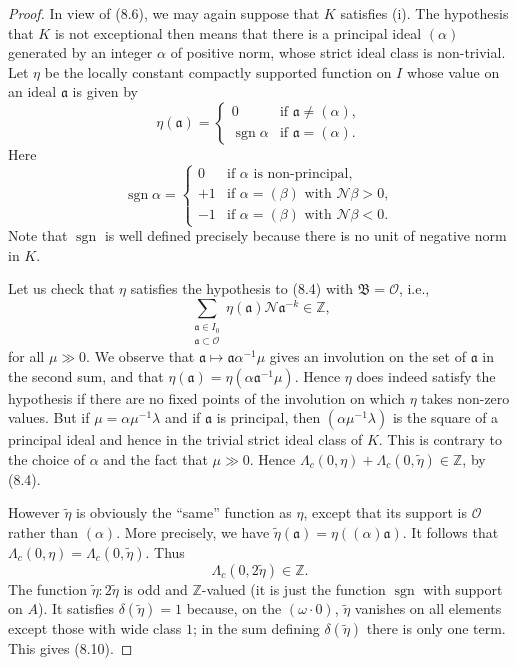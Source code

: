 \documentclass[12pt,a4paper]{article}
\theoremstyle{plain}
\theoremstyle{definition}
\theoremstyle{remark}
\DeclareMathOperator{\sgn}{sgn}
\begin{document}
\begin{proof}
In view of (8.6), we may again suppose that $K$ satisfies (i). The hypothesis that $K$ is not exceptional then means that there is a principal ideal $(\alpha)$ generated by an integer $\alpha$ of positive norm, whose strict ideal class is non-trivial. Let $\eta$ be the locally constant compactly supported function on $I$ whose value on an ideal $\mathfrak{a}$ is given by
\[
\eta(\mathfrak{a}) = \begin{cases}
0 & \text{if } \mathfrak{a} \neq (\alpha), \\
\sgn \alpha & \text{if } \mathfrak{a} = (\alpha).
\end{cases}
\]
Here
\[
\sgn \alpha = \begin{cases}
0 & \text{if } \alpha \text{ is non-principal}, \\
+1 & \text{if } \alpha = (\beta) \text{ with } \mathcal{N}\beta > 0, \\
-1 & \text{if } \alpha = (\beta) \text{ with } \mathcal{N}\beta < 0.
\end{cases}
\]
Note that $\sgn$ is well defined precisely because there is no unit of negative norm in $K$.

Let us check that $\eta$ satisfies the hypothesis to (8.4) with $\mathfrak{B} = \mathcal{O}$, i.e.,
\[
\sum_{\substack{\mathfrak{a} \in I_0 \\ \mathfrak{a} \subset \mathcal{O}}} \eta(\mathfrak{a}) \mathcal{N}\mathfrak{a}^{-k} \in \mathbb{Z},
\]
for all $\mu \gg 0$. We observe that $\mathfrak{a} \mapsto \mathfrak{a}\alpha^{-1}\mu$ gives an involution on the set of $\mathfrak{a}$ in the second sum, and that $\eta(\mathfrak{a}) = \eta(\alpha\mathfrak{a}^{-1}\mu)$. Hence $\eta$ does indeed satisfy the hypothesis if there are no fixed points of the involution on which $\eta$ takes non-zero values. But if $\mu = \alpha\mu^{-1}\lambda$ and if $\mathfrak{a}$ is principal, then $(\alpha\mu^{-1}\lambda)$ is the square of a principal ideal and hence in the trivial strict ideal class of $K$. This is contrary to the choice of $\alpha$ and the fact that $\mu \gg 0$. Hence $\varLambda_c(0, \eta) + \varLambda_c(0, \tilde{\eta}) \in \mathbb{Z}$, by (8.4).

However $\tilde{\eta}$ is obviously the ``same'' function as $\eta$, except that its support is $\mathcal{O}$ rather than $(\alpha)$. More precisely, we have $\tilde{\eta}(\mathfrak{a}) = \eta((\alpha)\mathfrak{a})$. It follows that $\varLambda_c(0, \eta) = \varLambda_c(0, \tilde{\eta})$. Thus
\[
\varLambda_c(0, 2\tilde{\eta}) \in \mathbb{Z}.
\]
The function $\tilde{\eta}: 2\tilde{\eta}$ is odd and $\mathbb{Z}$-valued (it is just the function $\sgn$ with support on $A$). It satisfies $\delta(\tilde{\eta}) = 1$ because, on the $(\omega \cdot 0)$, $\tilde{\eta}$ vanishes on all elements except those with wide class $1$; in the sum defining $\delta(\tilde{\eta})$ there is only one term. This gives (8.10).
\end{proof}
\end{document}
